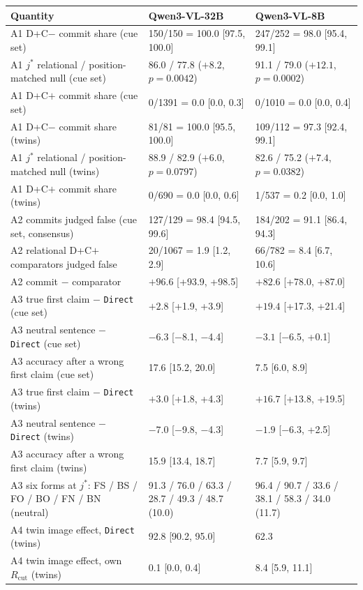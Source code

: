 \begin{tabular}{lll}
\toprule
Quantity & Qwen3-VL-32B & Qwen3-VL-8B \\
\midrule
A1 D+C$-$ commit share (cue set) & 150/150 = 100.0 [97.5, 100.0] & 247/252 = 98.0 [95.4, 99.1] \\
A1 $j^\ast$ relational / position-matched null (cue set) & 86.0 / 77.8 ($+8.2$, $p=0.0042$) & 91.1 / 79.0 ($+12.1$, $p=0.0002$) \\
A1 D+C$+$ commit share (cue set) & 0/1391 = 0.0 [0.0, 0.3] & 0/1010 = 0.0 [0.0, 0.4] \\
A1 D+C$-$ commit share (twins) & 81/81 = 100.0 [95.5, 100.0] & 109/112 = 97.3 [92.4, 99.1] \\
A1 $j^\ast$ relational / position-matched null (twins) & 88.9 / 82.9 ($+6.0$, $p=0.0797$) & 82.6 / 75.2 ($+7.4$, $p=0.0382$) \\
A1 D+C$+$ commit share (twins) & 0/690 = 0.0 [0.0, 0.6] & 1/537 = 0.2 [0.0, 1.0] \\
A2 commits judged false (cue set, consensus) & 127/129 = 98.4 [94.5, 99.6] & 184/202 = 91.1 [86.4, 94.3] \\
A2 relational D+C$+$ comparators judged false & 20/1067 = 1.9 [1.2, 2.9] & 66/782 = 8.4 [6.7, 10.6] \\
A2 commit $-$ comparator & $+96.6$ [+93.9, +98.5] & $+82.6$ [+78.0, +87.0] \\
A3 true first claim $-$ \texttt{Direct} (cue set) & $+2.8$ [+1.9, +3.9] & $+19.4$ [+17.3, +21.4] \\
A3 neutral sentence $-$ \texttt{Direct} (cue set) & $-6.3$ [$-$8.1, $-$4.4] & $-3.1$ [$-$6.5, +0.1] \\
A3 accuracy after a wrong first claim (cue set) & 17.6 [15.2, 20.0] & 7.5 [6.0, 8.9] \\
A3 true first claim $-$ \texttt{Direct} (twins) & $+3.0$ [+1.8, +4.3] & $+16.7$ [+13.8, +19.5] \\
A3 neutral sentence $-$ \texttt{Direct} (twins) & $-7.0$ [$-$9.8, $-$4.3] & $-1.9$ [$-$6.3, +2.5] \\
A3 accuracy after a wrong first claim (twins) & 15.9 [13.4, 18.7] & 7.7 [5.9, 9.7] \\
A3 six forms at $j^\ast$: FS / BS / FO / BO / FN / BN (neutral) & 91.3 / 76.0 / 63.3 / 28.7 / 49.3 / 48.7 (10.0) & 96.4 / 90.7 / 33.6 / 38.1 / 58.3 / 34.0 (11.7) \\
A4 twin image effect, \texttt{Direct} (twins) & 92.8 [90.2, 95.0] & 62.3 \\
A4 twin image effect, own $R_\mathrm{cut}$ (twins) & 0.1 [0.0, 0.4] & 8.4 [5.9, 11.1] \\

\end{tabular}
